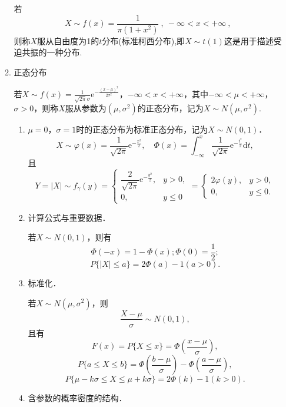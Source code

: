 \begin{enumerate}
\begin{enumerate}
                    若
                    $$X\sim f(x)=\frac{1}{\pi(1+x^{2})}\:,\:-\infty<x<+\infty\:,$$
                    则称$X$服从自由度为1的$t$分布(标准柯西分布),即$X\sim t(1)$这是用于描述受迫共振的一种分布.
              \item 正态分布

                    若$X\sim f(x)=\frac{1}{\sqrt{2\pi}\sigma}\mathrm{e}^{-\frac{(x-\mu)^2}{2\sigma^2}}$，$-\infty<x<+\infty$，其中$-\infty<\mu<+\infty$，$\sigma>0$，则称$X$服从参数为$(\mu,\sigma^2)$的正态分布，记为$X\sim N(\mu,\sigma^2)$.
                    \begin{note}{}{}
                        \begin{enumerate}
                            \item  $\mu=0$，$\sigma=1$时的正态分布为标准正态分布，记为$X\sim N(0,1)$．
                                  $$X\sim\varphi(x)=\frac{1}{\sqrt{2\pi}}\mathrm{e}^{-\frac{x^2}{2}}, \quad \Phi(x)=\int_{-\infty}^x\frac{1}{\sqrt{2\pi}}\mathrm{e}^{-\frac{t^2}{2}}\mathrm{d}t,$$
                                  且
                                  $$Y=\mid X\mid\sim f_{\gamma}(y)=\begin{cases}\dfrac{2}{\sqrt{2\pi}}\mathrm{e}^{-\frac{y^{2}}{2}},&y>0,\\0,&y\leqslant0\end{cases}=\begin{cases}2\varphi(y),&y>0,\\0,&y\leqslant0.\end{cases}$$
                            \item 计算公式与重要数据．

                                  若$X\sim N(0,1)$，则有
                                  $$
                                      \Phi(-x)=1-\Phi(x); \Phi(0)=\frac{1}{2};$$
                                  $$P\{|X|\leqslant a\}=2\Phi(a)-1(a>0).$$

                            \item 标准化．

                                  若$X\sim N(\mu,\sigma^2)$，则
                                  $$
                                      \frac{X-\mu}{\sigma}\sim N(0,1),$$
                                  且有
                                  $$F(x)=P\{X\leqslant x\}=\Phi\left(\frac{x-\mu}{\sigma}\right),$$
                                  $$
                                      P\{a\leqslant X\leqslant b\}=\Phi\left(\frac{b-\mu}{\sigma}\right)-\Phi\left(\frac{a-\mu}{\sigma}\right),$$
                                  $$P\{\mu-k\sigma\leqslant X\leqslant\mu+k\sigma\}=2\Phi(k)-1(k>0).$$
                            \item 含参数的概率密度的结构．


\end{enumerate}
\end{note}
\end{enumerate}
\end{enumerate}
